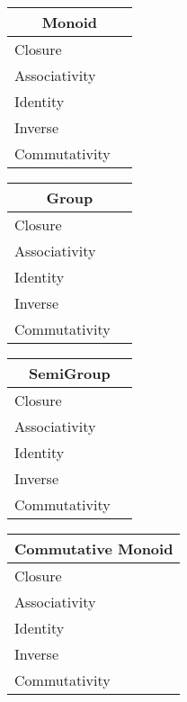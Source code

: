 \documentclass[a4paper,12pt]{scrartcl}
\begin{document}
\begin{landscape}
\begin{minipage}[c][.80\textheight]{0,5\textwidth}
\vspace{0.6cm}
\begin{tabular}{|l|p{2cm}|} %
  \hline
  \multicolumn{2}{c}{\cellcolor{yellow!25}Monoid} \\
  \hline
   \cellcolor{blue!25} Closure&  \\
    \cellcolor{blue!25} Associativity&  \\
    \cellcolor{blue!25} Identity&  \\
    \cellcolor{red!25} Inverse&  \\
    \cellcolor{red!25} Commutativity&  \\
  \hline
\end{tabular}

\vspace{0.6cm}
\begin{tabular}{|l|p{2cm}|} %
  \hline
  \multicolumn{2}{c}{\cellcolor{yellow!25}Group} \\
  \hline
   \cellcolor{blue!25} Closure&  \\
    \cellcolor{blue!25} Associativity&  \\
    \cellcolor{blue!25} Identity&  \\
    \cellcolor{blue!25} Inverse&  \\
    \cellcolor{red!25} Commutativity&  \\
  \hline
\end{tabular}

\end{minipage}
\begin{minipage}[c]{0,5\textwidth}

\begin{tabular}{|l|p{2cm}|} %
  \hline
  \multicolumn{2}{c}{\cellcolor{yellow!25}SemiGroup} \\
  \hline
   \cellcolor{blue!25} Closure&  \\
    \cellcolor{blue!25} Associativity&  \\
    \cellcolor{red!25} Identity&  \\
    \cellcolor{red!25} Inverse&  \\
    \cellcolor{red!25} Commutativity&  \\
  \hline
\end{tabular}

\vspace{0.6cm}
\begin{tabular}{|l|p{2cm}|} %
  \hline
  \multicolumn{2}{c}{\cellcolor{yellow!25}Commutative Monoid} \\
  \hline
   \cellcolor{blue!25} Closure&  \\
    \cellcolor{blue!25} Associativity&  \\
    \cellcolor{blue!25} Identity&  \\
    \cellcolor{red!25} Inverse&  \\
    \cellcolor{blue!25} Commutativity&  \\
  \hline
\end{tabular}


\end{minipage}
\end{landscape}
\end{document}
